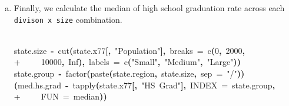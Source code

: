 \documentclass{article}
\newcommand{\hlnumber}[1]{\textcolor[rgb]{0.0823529411764706,0.0784313725490196,0.709803921568627}{#1}}%
\newcommand{\hlfunctioncall}[1]{\textcolor[rgb]{1,0,0}{#1}}%
\newcommand{\hlstring}[1]{\textcolor[rgb]{0.6,0.6,1}{#1}}%
\newcommand{\hlkeyword}[1]{\textcolor[rgb]{0,0,0}{\textbf{#1}}}%
\newcommand{\hlargument}[1]{\textcolor[rgb]{0.694117647058824,0.247058823529412,0.0196078431372549}{#1}}%
\newcommand{\hlassignement}[1]{\textcolor[rgb]{0.215686274509804,0.215686274509804,0.384313725490196}{\textbf{#1}}}%
\newcommand{\hlsymbol}[1]{\textcolor[rgb]{0,0,0}{#1}}%
\newcommand{\hlprompt}[1]{\textcolor[rgb]{0,0,0}{#1}}%
\newcommand{\hlstd}[1]{\textcolor[rgb]{0,0,0}{#1}}%
\newenvironment{Houtput}{\raggedright}{%
%
}
\begin{document}
\begin{enumerate}[(a)]
\begin{Houtput}
\begin{Schunk}
\end{Schunk}
\end{Houtput}
        \item Finally, we calculate the median of high school graduation rate across each \verb=divison x size= combination.
\begin{Houtput}
\hspace*{\fill}\\
\hlstd{}\ttfamily\noindent
\hlprompt{\usebox{\hlnormalsizeboxgreaterthan}{\ }}\hlsymbol{state.size}{\ }\hlassignement{\usebox{\hlnormalsizeboxlessthan}-}{\ }\hlfunctioncall{cut}\hlkeyword{(}\hlsymbol{state.x77}\hlkeyword{[}\hlkeyword{,}{\ }\hlstring{"Population"}\hlkeyword{]}\hlkeyword{,}{\ }\hlargument{breaks}{\ }\hlargument{=}{\ }\hlfunctioncall{c}\hlkeyword{(}\hlnumber{0}\hlkeyword{,}{\ }\hlnumber{2000}\hlkeyword{,}\hspace*{\fill}\\
\hlstd{}\hlprompt{+{\ }}{\ }{\ }{\ }{\ }\hlnumber{10000}\hlkeyword{,}{\ }\hlnumber{Inf}\hlkeyword{)}\hlkeyword{,}{\ }\hlargument{labels}{\ }\hlargument{=}{\ }\hlfunctioncall{c}\hlkeyword{(}\hlstring{"Small"}\hlkeyword{,}{\ }\hlstring{"Medium"}\hlkeyword{,}{\ }\hlstring{"Large"}\hlkeyword{)}\hlkeyword{)}\mbox{}
\normalfont
\hspace*{\fill}\\
\hlstd{}\ttfamily\noindent
\hlprompt{\usebox{\hlnormalsizeboxgreaterthan}{\ }}\hlsymbol{state.group}{\ }\hlassignement{\usebox{\hlnormalsizeboxlessthan}-}{\ }\hlfunctioncall{factor}\hlkeyword{(}\hlfunctioncall{paste}\hlkeyword{(}\hlsymbol{state.region}\hlkeyword{,}{\ }\hlsymbol{state.size}\hlkeyword{,}{\ }\hlargument{sep}{\ }\hlargument{=}{\ }\hlstring{"/"}\hlkeyword{)}\hlkeyword{)}\mbox{}
\normalfont
\hspace*{\fill}\\
\hlstd{}\ttfamily\noindent
\hlprompt{\usebox{\hlnormalsizeboxgreaterthan}{\ }}\hlkeyword{(}\hlsymbol{med.hs.grad}{\ }\hlassignement{\usebox{\hlnormalsizeboxlessthan}-}{\ }\hlfunctioncall{tapply}\hlkeyword{(}\hlsymbol{state.x77}\hlkeyword{[}\hlkeyword{,}{\ }\hlstring{"HS{\ }Grad"}\hlkeyword{]}\hlkeyword{,}{\ }\hlargument{INDEX}{\ }\hlargument{=}{\ }\hlsymbol{state.group}\hlkeyword{,}\hspace*{\fill}\\
\hlstd{}\hlprompt{+{\ }}{\ }{\ }{\ }{\ }\hlargument{FUN}{\ }\hlargument{=}{\ }\hlsymbol{median}\hlkeyword{)}\hlkeyword{)}\mbox{}
\normalfont
\hspace*{\fill}\\
\hlstd{}\begin{Schunk}

\end{Schunk}
\end{Houtput}
\end{enumerate}
\end{document}
